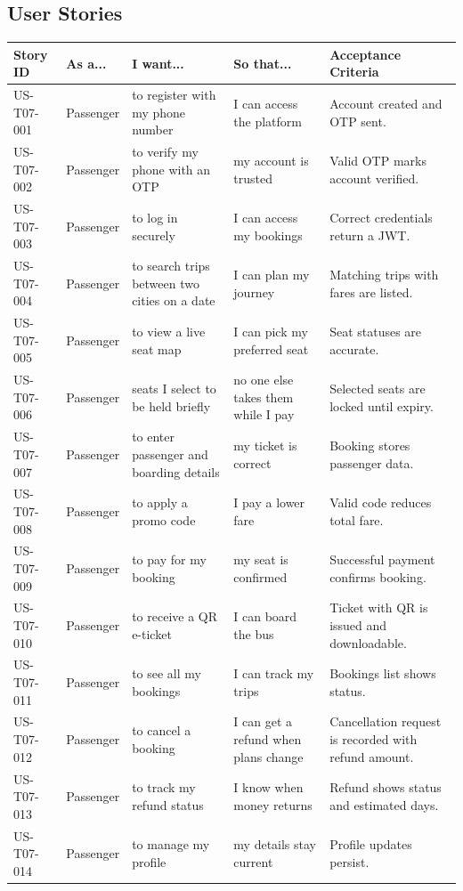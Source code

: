 \documentclass[11pt,a4paper]{article}
\newcommand{\rowstyle}{\rowcolor{headergray}}
\begin{document}
\subsection{User Stories}
\begin{longtable}{p{2.1cm} p{1.9cm} Y Y Y}
\toprule
\rowstyle \textbf{Story ID} & \textbf{As a...} & \textbf{I want...} & \textbf{So that...} & \textbf{Acceptance Criteria} \\
\midrule
\endhead
US-T07-001 & Passenger & to register with my phone number & I can access the platform & Account created and OTP sent. \\
US-T07-002 & Passenger & to verify my phone with an OTP & my account is trusted & Valid OTP marks account verified. \\
US-T07-003 & Passenger & to log in securely & I can access my bookings & Correct credentials return a JWT. \\
US-T07-004 & Passenger & to search trips between two cities on a date & I can plan my journey & Matching trips with fares are listed. \\
US-T07-005 & Passenger & to view a live seat map & I can pick my preferred seat & Seat statuses are accurate. \\
US-T07-006 & Passenger & seats I select to be held briefly & no one else takes them while I pay & Selected seats are locked until expiry. \\
US-T07-007 & Passenger & to enter passenger and boarding details & my ticket is correct & Booking stores passenger data. \\
US-T07-008 & Passenger & to apply a promo code & I pay a lower fare & Valid code reduces total fare. \\
US-T07-009 & Passenger & to pay for my booking & my seat is confirmed & Successful payment confirms booking. \\
US-T07-010 & Passenger & to receive a QR e-ticket & I can board the bus & Ticket with QR is issued and downloadable. \\
US-T07-011 & Passenger & to see all my bookings & I can track my trips & Bookings list shows status. \\
US-T07-012 & Passenger & to cancel a booking & I can get a refund when plans change & Cancellation request is recorded with refund amount. \\
US-T07-013 & Passenger & to track my refund status & I know when money returns & Refund shows status and estimated days. \\
US-T07-014 & Passenger & to manage my profile & my details stay current & Profile updates persist. \\

\end{longtable}
\end{document}
